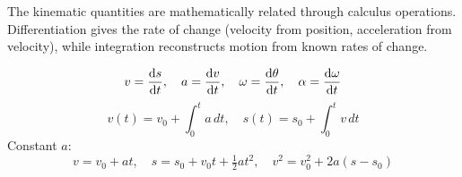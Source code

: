\documentclass[11pt,a4paper]{article}
\begin{document}
The kinematic quantities are mathematically related through calculus operations. Differentiation gives the rate of change (velocity from position, acceleration from velocity), while integration reconstructs motion from known rates of change.

\[
v = \dv{s}{t}, \quad a = \dv{v}{t}, \quad \omega = \dv{\theta}{t}, \quad \alpha = \dv{\omega}{t}
\]
\[
v(t) = v_0 + \int_0^t a \,dt, \quad
s(t) = s_0 + \int_0^t v \,dt
\]
Constant $a$:
\[
v=v_0+at, \quad s=s_0+v_0 t+\tfrac12 at^2, \quad v^2=v_0^2+2a(s-s_0)
\]

%
%
%
%
%
\end{document}
